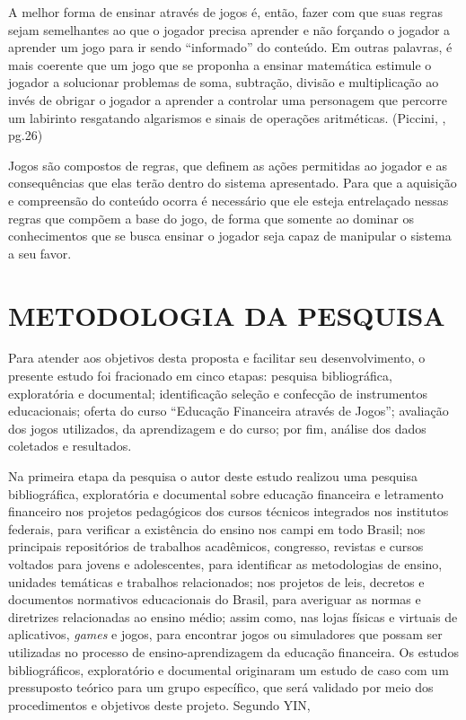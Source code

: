 \begin{citacao}
A melhor forma de ensinar através de jogos é, então, fazer com que suas regras sejam semelhantes ao que o jogador precisa aprender e não forçando o jogador a aprender um jogo para ir sendo “informado” do conteúdo. Em outras palavras, é mais coerente que um jogo que se proponha a ensinar matemática estimule o jogador a solucionar problemas de soma, subtração, divisão e multiplicação ao invés de obrigar o jogador a aprender a controlar uma personagem que percorre um labirinto resgatando algarismos e sinais de operações aritméticas. (Piccini, \citeyear{piccini2008}, pg.26)
\end{citacao}

Jogos são compostos de regras, que definem as ações permitidas ao jogador e as consequências que elas terão dentro do sistema apresentado. Para que a aquisição e compreensão do conteúdo ocorra é necessário que ele esteja entrelaçado nessas regras que compõem a base do jogo, de forma que somente ao dominar os conhecimentos que se busca ensinar o jogador seja capaz de manipular o sistema a seu favor.

\chapter{METODOLOGIA DA PESQUISA}
Para atender aos objetivos desta proposta e facilitar seu desenvolvimento, o presente estudo foi fracionado em cinco etapas: pesquisa bibliográfica, exploratória e documental; identificação seleção e confecção de instrumentos educacionais; oferta do curso “Educação Financeira através de Jogos”; avaliação dos jogos utilizados, da aprendizagem e do curso; por fim, análise dos dados coletados e resultados.

Na primeira etapa da pesquisa o autor deste estudo realizou uma pesquisa bibliográfica, exploratória e documental sobre educação financeira e letramento financeiro nos projetos pedagógicos dos cursos técnicos integrados nos institutos federais, para verificar a existência do ensino nos campi em todo Brasil; nos principais repositórios de trabalhos acadêmicos, congresso, revistas e cursos voltados para jovens e adolescentes, para identificar as metodologias de ensino, unidades temáticas e trabalhos relacionados; nos projetos de leis, decretos e documentos normativos educacionais do Brasil, para averiguar as normas e diretrizes relacionadas ao ensino médio; assim como, nas lojas físicas e virtuais de aplicativos, \textit{games} e jogos, para encontrar jogos ou simuladores que possam ser utilizadas no processo de ensino-aprendizagem da educação financeira. Os estudos bibliográficos, exploratório e documental originaram um estudo de caso com um pressuposto teórico para um grupo específico, que será validado por meio dos procedimentos e objetivos deste projeto. Segundo YIN,

